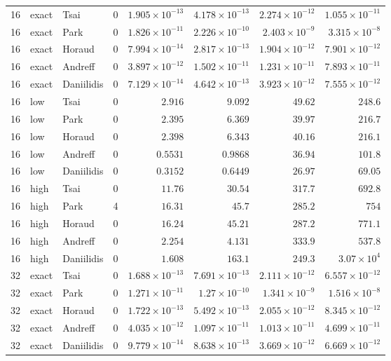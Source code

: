 \begin{longtable}{rllrrrrr}
16 & exact & Tsai & 0 & $1.905\times10^{-13}$ & $4.178\times10^{-13}$ & $2.274\times10^{-12}$ & $1.055\times10^{-11}$ \\
16 & exact & Park & 0 & $1.826\times10^{-11}$ & $2.226\times10^{-10}$ & $2.403\times10^{-9}$ & $3.315\times10^{-8}$ \\
16 & exact & Horaud & 0 & $7.994\times10^{-14}$ & $2.817\times10^{-13}$ & $1.904\times10^{-12}$ & $7.901\times10^{-12}$ \\
16 & exact & Andreff & 0 & $3.897\times10^{-12}$ & $1.502\times10^{-11}$ & $1.231\times10^{-11}$ & $7.893\times10^{-11}$ \\
16 & exact & Daniilidis & 0 & $7.129\times10^{-14}$ & $4.642\times10^{-13}$ & $3.923\times10^{-12}$ & $7.555\times10^{-12}$ \\
16 & low & Tsai & 0 & $2.916$ & $9.092$ & $49.62$ & $248.6$ \\
16 & low & Park & 0 & $2.395$ & $6.369$ & $39.97$ & $216.7$ \\
16 & low & Horaud & 0 & $2.398$ & $6.343$ & $40.16$ & $216.1$ \\
16 & low & Andreff & 0 & $0.5531$ & $0.9868$ & $36.94$ & $101.8$ \\
16 & low & Daniilidis & 0 & $0.3152$ & $0.6449$ & $26.97$ & $69.05$ \\
16 & high & Tsai & 0 & $11.76$ & $30.54$ & $317.7$ & $692.8$ \\
16 & high & Park & 4 & $16.31$ & $45.7$ & $285.2$ & $754$ \\
16 & high & Horaud & 0 & $16.24$ & $45.21$ & $287.2$ & $771.1$ \\
16 & high & Andreff & 0 & $2.254$ & $4.131$ & $333.9$ & $537.8$ \\
16 & high & Daniilidis & 0 & $1.608$ & $163.1$ & $249.3$ & $3.07\times10^{4}$ \\
32 & exact & Tsai & 0 & $1.688\times10^{-13}$ & $7.691\times10^{-13}$ & $2.111\times10^{-12}$ & $6.557\times10^{-12}$ \\
32 & exact & Park & 0 & $1.271\times10^{-11}$ & $1.27\times10^{-10}$ & $1.341\times10^{-9}$ & $1.516\times10^{-8}$ \\
32 & exact & Horaud & 0 & $1.722\times10^{-13}$ & $5.492\times10^{-13}$ & $2.055\times10^{-12}$ & $8.345\times10^{-12}$ \\
32 & exact & Andreff & 0 & $4.035\times10^{-12}$ & $1.097\times10^{-11}$ & $1.013\times10^{-11}$ & $4.699\times10^{-11}$ \\
32 & exact & Daniilidis & 0 & $9.779\times10^{-14}$ & $8.638\times10^{-13}$ & $3.669\times10^{-12}$ & $6.669\times10^{-12}$ \\

\end{longtable}
